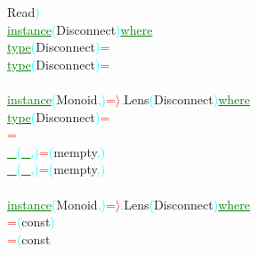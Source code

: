 {\rm{}Read}\textcolor{cyan}{)}\\\textcolor{green}{\underline{instance}}\hsspace \textcolor{cyan}{(}{\rm{}Disconnect}\textcolor{cyan}{)}\hsspace \textcolor{green}{\underline{where}}\\\hstab \textcolor{green}{\underline{type}}\hsspace \textcolor{cyan}{(}{\rm{}Disconnect}\textcolor{cyan}{)}\hsspace \textcolor{red}{=}\\\hstab \textcolor{green}{\underline{type}}\hsspace \textcolor{cyan}{(}{\rm{}Disconnect}\textcolor{cyan}{)}\hsspace \textcolor{red}{=}\\\\\textcolor{green}{\underline{instance}}\hsspace \textcolor{cyan}{(}{\rm{}Monoid}\textcolor{cyan}{,}\textcolor{cyan}{)}\hsspace \textcolor{red}{=\ensuremath{\rangle}}\textcolor{cyan}{.}{\rm{}Lens}\hsspace \textcolor{cyan}{(}{\rm{}Disconnect}\textcolor{cyan}{)}\hsspace \textcolor{green}{\underline{where}}\\\hstab \textcolor{green}{\underline{type}}\hsspace \textcolor{cyan}{(}{\rm{}Disconnect}\textcolor{cyan}{)}\hsspace \textcolor{red}{=}\hsspace {\rm{}()}\\\hsspace \textcolor{red}{=}\hsspace {\rm{}()}\\\hsspace \textcolor{green}{\underline{\_}}\hsspace \textcolor{cyan}{(}\textcolor{green}{\underline{\_}}\textcolor{cyan}{,}\textcolor{cyan}{)}\hsspace \textcolor{red}{=}\hsspace \textcolor{cyan}{(}{\rm{}mempty}\textcolor{cyan}{,}\textcolor{cyan}{)}\\\hsspace \textcolor{green}{\underline{\_}}\hsspace \textcolor{cyan}{(}\textcolor{green}{\underline{\_}}\textcolor{cyan}{,}\textcolor{cyan}{)}\hsspace \textcolor{red}{=}\hsspace \textcolor{cyan}{(}{\rm{}mempty}\textcolor{cyan}{,}\textcolor{cyan}{)}\\\\\textcolor{green}{\underline{instance}}\hsspace \textcolor{cyan}{(}{\rm{}Monoid}\textcolor{cyan}{,}\textcolor{cyan}{)}\hsspace \textcolor{red}{=\ensuremath{\rangle}}\textcolor{cyan}{.}{\rm{}Lens}\hsspace \textcolor{cyan}{(}{\rm{}Disconnect}\textcolor{cyan}{)}\hsspace \textcolor{green}{\underline{where}}\\\hsspace \textcolor{red}{=}\hsspace \textcolor{cyan}{(}{\rm{}const}\textcolor{cyan}{)}\\\hsspace \textcolor{red}{=}\hsspace \textcolor{cyan}{(}{\rm{}const}\hsspace 